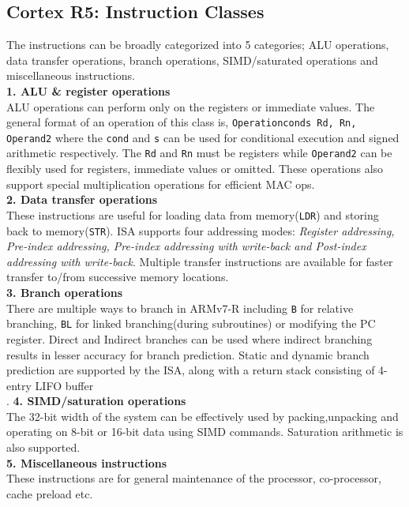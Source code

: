 \documentclass[a4paper,11pt]{article}
\begin{document}
\subsection{Cortex R5: Instruction Classes}
The instructions can be broadly categorized into 5 categories; ALU operations, data transfer operations, branch operations, SIMD/saturated operations and miscellaneous instructions.\cite{ARMpg}\\
\textbf{1. ALU \& register operations}\\
ALU operations can perform only on the registers or immediate values. The general format of an operation of this class is, {\tt Operation{cond}{s} Rd, Rn, Operand2} where the {\tt cond} and {\tt s} can be used for conditional execution and signed arithmetic respectively. The {\tt Rd} and {\tt Rn} must be registers while {\tt Operand2} can be flexibly used for registers, immediate values or omitted. These operations also support special multiplication operations for efficient MAC ops.\\
\textbf{2. Data transfer operations}\\
These instructions are useful for loading data from memory({\tt LDR}) and storing back to memory({\tt STR}). ISA supports four addressing modes: \textit{Register addressing, Pre-index addressing, Pre-index addressing with write-back and Post-index addressing with write-back}. Multiple transfer instructions are available for faster transfer to/from successive memory locations.\\
\textbf{3. Branch operations}\\
There are multiple ways to branch in ARMv7-R including {\tt B} for relative branching, {\tt BL} for linked branching(during subroutines) or modifying the PC register. Direct and Indirect branches can be used where indirect branching results in lesser accuracy for branch prediction. Static and dynamic branch prediction are supported by the ISA, along with a return stack consisting of 4-entry LIFO buffer\\.
\textbf{4. SIMD/saturation operations}\\
The 32-bit width of the system can be effectively used by packing,unpacking and operating on 8-bit or 16-bit data using SIMD commands. Saturation arithmetic is also supported.\\
\textbf{5. Miscellaneous instructions}\\
These instructions are for general maintenance of the processor, co-processor, cache preload etc.
\end{document}
